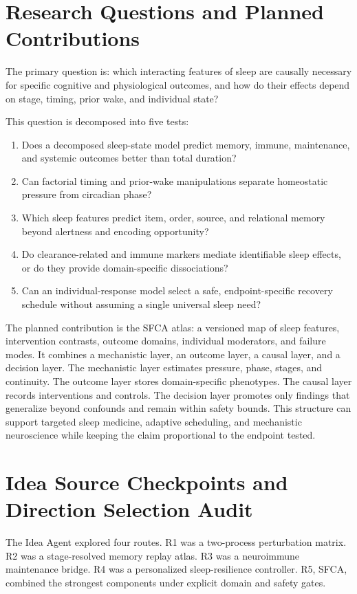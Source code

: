 \documentclass[conference]{IEEEtran}
\begin{document}
\section{Research Questions and Planned Contributions}
The primary question is: which interacting features of sleep are causally necessary for specific cognitive and physiological outcomes, and how do their effects depend on stage, timing, prior wake, and individual state?

This question is decomposed into five tests:
\begin{enumerate}
\item Does a decomposed sleep-state model predict memory, immune, maintenance, and systemic outcomes better than total duration?
\item Can factorial timing and prior-wake manipulations separate homeostatic pressure from circadian phase?
\item Which sleep features predict item, order, source, and relational memory beyond alertness and encoding opportunity?
\item Do clearance-related and immune markers mediate identifiable sleep effects, or do they provide domain-specific dissociations?
\item Can an individual-response model select a safe, endpoint-specific recovery schedule without assuming a single universal sleep need?
\end{enumerate}

The planned contribution is the SFCA atlas: a versioned map of sleep features, intervention contrasts, outcome domains, individual moderators, and failure modes. It combines a mechanistic layer, an outcome layer, a causal layer, and a decision layer. The mechanistic layer estimates pressure, phase, stages, and continuity. The outcome layer stores domain-specific phenotypes. The causal layer records interventions and controls. The decision layer promotes only findings that generalize beyond confounds and remain within safety bounds. This structure can support targeted sleep medicine, adaptive scheduling, and mechanistic neuroscience while keeping the claim proportional to the endpoint tested.

\section{Idea Source Checkpoints and Direction Selection Audit}
The Idea Agent explored four routes. R1 was a two-process perturbation matrix. R2 was a stage-resolved memory replay atlas. R3 was a neuroimmune maintenance bridge. R4 was a personalized sleep-resilience controller. R5, SFCA, combined the strongest components under explicit domain and safety gates.
\end{document}
